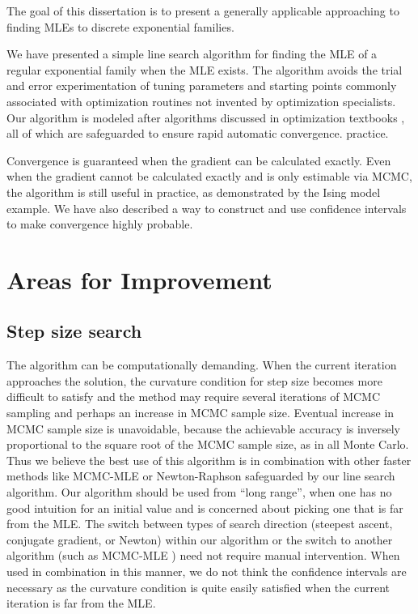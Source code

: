 The goal of this dissertation is to present a generally applicable approaching
to finding MLEs to discrete exponential families.

We have presented a simple line search algorithm for finding the MLE of a regular 
exponential family when the MLE 
exists.  The algorithm avoids the trial and error experimentation of tuning parameters 
and starting points commonly associated with optimization routines
not invented by optimization specialists.  Our algorithm is modeled after algorithms 
discussed in optimization textbooks \citep{Fletcher,NW,Sun:2006},
all of which are safeguarded to ensure rapid automatic convergence.
practice.

Convergence is guaranteed when the gradient can be calculated exactly.  Even when the 
gradient cannot be calculated 
exactly and is only estimable via MCMC, the algorithm is still useful in practice, as 
demonstrated by the Ising model 
example.  We have also described a way to construct and use confidence intervals to 
make convergence highly probable.


\section{Areas for Improvement}
\subsection{Step size search}
The algorithm can be computationally demanding.  When the current iteration approaches 
the solution, the 
curvature condition for step size becomes more difficult to satisfy and the method may 
require several iterations of 
MCMC sampling and perhaps an increase in MCMC sample size.  Eventual increase in MCMC 
sample size is unavoidable,
because the achievable accuracy is inversely proportional to the square root of the 
MCMC sample size, as in all Monte Carlo.
Thus we believe the best use of this algorithm is in combination with other faster 
methods like MCMC-MLE \citep{Geyer:1992}
or Newton-Raphson safeguarded by our line search algorithm.  Our 
algorithm should be used from ``long range'', when one has no good intuition for an 
initial value and is concerned about 
picking one that is far from the MLE.  The switch between types of search direction 
(steepest ascent, conjugate gradient,
or Newton) within our algorithm or the switch to another algorithm (such as MCMC-MLE 
\citep{Geyer:1992})
need not require manual intervention.  When used in combination in this
manner, we do not think the confidence intervals are necessary as the curvature 
condition is quite easily satisfied 
when the current iteration is far from the MLE.

